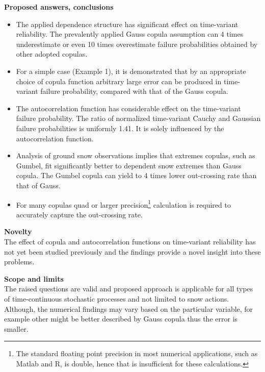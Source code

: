 \begin{enumerate}[leftmargin=*, align=left]
    \textbf{Proposed answers, conclusions}
    \begin{itemize}
      \item The applied dependence structure has significant effect on time-variant reliability. The prevalently applied Gauss copula assumption can 4 times underestimate or even 10 times overestimate failure probabilities obtained by other adopted copulas.
      \item For a simple case (Example 1), it is demonstrated that by an appropriate choice of copula function arbitrary large error can be produced in time-variant failure probability, compared with that of the Gauss copula.
      \item The autocorrelation function has considerable effect on the time-variant failure probability. The ratio of normalized time-variant Cauchy and Gaussian failure probabilities is uniformly 1.41. It is solely influenced by the autocorrelation function.
      \item Analysis of ground snow observations implies that extremes copulas, such as Gumbel, fit significantly better to dependent snow extremes than Gauss copula. The Gumbel copula can yield to 4 times lower out-crossing rate than that of Gauss.
      \item For many copulas quad or larger precision\footnote{The standard floating point precision in most numerical applications, such as Matlab and R, is double, hence that is insufficient for these calculations.} calculation is required to accurately capture the out-crossing rate.
    \end{itemize}

    \textbf{Novelty} \\
    The effect of copula and autocorrelation functions on time-variant reliability has not yet been studied previously and the findings provide a novel insight into these problems.
  
    \textbf{Scope and limits} \\
    The raised questions are valid and proposed approach is applicable for all types of time-continuous stochastic processes and not limited to snow actions.
    Although, the numerical findings may vary based on the particular variable, for example other might be better described by Gauss copula thus the error is smaller.
    
\end{enumerate}

